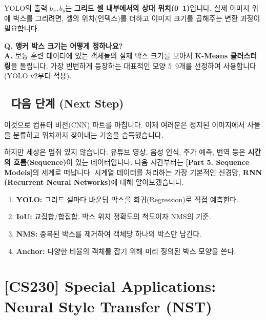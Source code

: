 \documentclass[11pt,a4paper]{book}
\theoremstyle{definition}
\begin{document}
\begin{warningbox}[title={좌표계 주의}]
YOLO의 출력 $b_x, b_y$는 \textbf{그리드 셀 내부에서의 상대 위치(0~1)}입니다. 실제 이미지 위에 박스를 그리려면, 셀의 위치(인덱스)를 더하고 이미지 크기를 곱해주는 변환 과정이 필요합니다.
\end{warningbox}

\textbf{Q. 앵커 박스 크기는 어떻게 정하나요?} \\
\textbf{A.} 보통 훈련 데이터에 있는 객체들의 실제 박스 크기를 모아서 \textbf{K-Means 클러스터링}을 돌립니다. 가장 빈번하게 등장하는 대표적인 모양 5~9개를 선정하여 사용합니다 (YOLO v2부터 적용).

\section*{🔗 다음 단계 (Next Step)}
이것으로 컴퓨터 비전(CNN) 파트를 마칩니다. 이제 여러분은 정지된 이미지에서 사물을 분류하고 위치까지 찾아내는 기술을 습득했습니다.

하지만 세상은 멈춰 있지 않습니다. 유튜브 영상, 음성 인식, 주가 예측, 번역 등은 \textbf{시간의 흐름(Sequence)}이 있는 데이터입니다.
다음 시간부터는 \textbf{[Part 5. Sequence Models]}의 세계로 떠납니다. 시계열 데이터를 처리하는 가장 기본적인 신경망, \textbf{RNN (Recurrent Neural Networks)}에 대해 알아보겠습니다.

\vspace{0.5cm}

\begin{summarybox}[title={단원 요약 (Cheat Sheet)}]
\begin{enumerate}
    \item \textbf{YOLO:} 그리드 셀마다 바운딩 박스를 회귀(Regression)로 직접 예측한다.
    \item \textbf{IoU:} 교집합/합집합. 박스 위치 정확도의 척도이자 NMS의 기준.
    \item \textbf{NMS:} 중복된 박스를 제거하여 객체당 하나의 박스만 남긴다.
    \item \textbf{Anchor:} 다양한 비율의 객체를 잡기 위해 미리 정의된 박스 모양을 쓴다.
\end{enumerate}
\end{summarybox}


\chapter{[CS230] Special Applications: \\ Neural Style Transfer (NST)}
\label{ch:lecture38}
\end{document}

